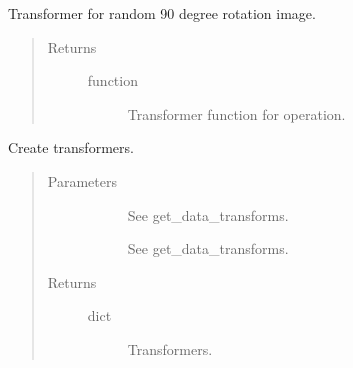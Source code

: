 \documentclass[letterpaper,10pt,english]{sphinxmanual}
\begin{document}

\begin{fulllineitems}
\label{\detokenize{index:pathflowai.datasets.RandomRotate90}}
Transformer for random 90 degree rotation image.
\begin{quote}\begin{description}
\item[{Returns}] \leavevmode\begin{description}
\item[{function}] \leavevmode
Transformer function for operation.

\end{description}

\end{description}\end{quote}

\end{fulllineitems}


\begin{fulllineitems}
\label{\detokenize{index:pathflowai.datasets.create_transforms}}
Create transformers.
\begin{quote}\begin{description}
\item[{Parameters}] \leavevmode\begin{description}
\item[{}] \leavevmode
See get\_data\_transforms.

\item[{}] \leavevmode
See get\_data\_transforms.

\end{description}

\item[{Returns}] \leavevmode\begin{description}
\item[{dict}] \leavevmode
Transformers.

\end{description}

\end{description}\end{quote}

\end{fulllineitems}
\end{document}
